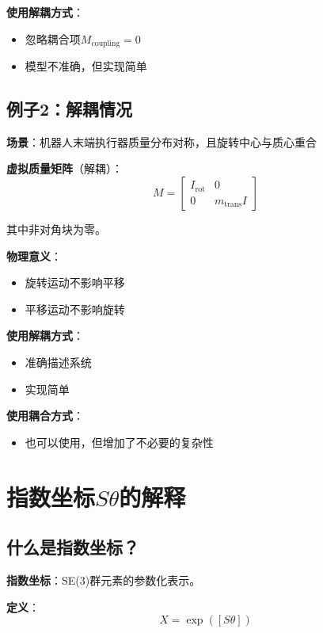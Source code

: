\documentclass[12pt,a4paper]{article}
\begin{document}
\textbf{使用解耦方式}：
\begin{itemize}
\item 忽略耦合项$M_{\text{coupling}} = 0$
\item 模型不准确，但实现简单
\end{itemize}

\subsection{例子2：解耦情况}

\textbf{场景}：机器人末端执行器质量分布对称，且旋转中心与质心重合

\textbf{虚拟质量矩阵}（解耦）：
\begin{equation}
M = \begin{bmatrix}
I_{\text{rot}} & 0 \\
0 & m_{\text{trans}}I
\end{bmatrix}
\end{equation}

其中非对角块为零。

\textbf{物理意义}：
\begin{itemize}
\item 旋转运动不影响平移
\item 平移运动不影响旋转
\end{itemize}

\textbf{使用解耦方式}：
\begin{itemize}
\item 准确描述系统
\item 实现简单
\end{itemize}

\textbf{使用耦合方式}：
\begin{itemize}
\item 也可以使用，但增加了不必要的复杂性
\end{itemize}

\section{指数坐标$S\theta$的解释}

\subsection{什么是指数坐标？}

\textbf{指数坐标}：SE(3)群元素的参数化表示。

\textbf{定义}：
\begin{equation}
X = \exp([S\theta])
\end{equation}
\end{document}

